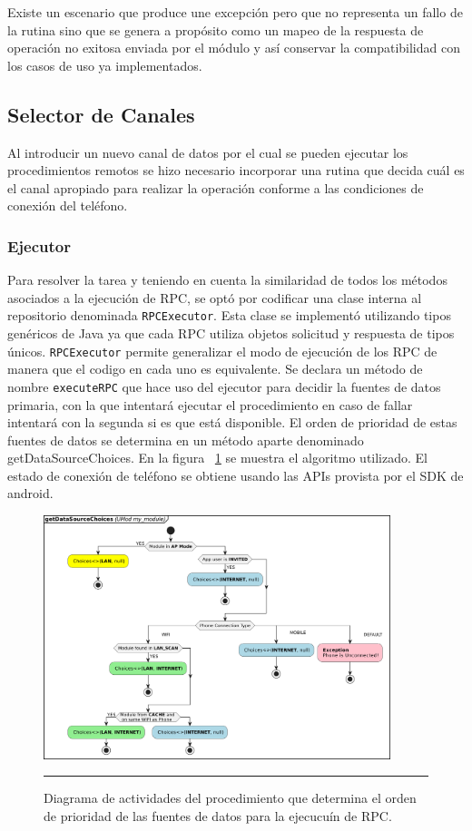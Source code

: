 Existe un escenario que produce une excepción pero que no representa un fallo de la rutina sino que se genera a propósito como un mapeo de la respuesta de operación no exitosa enviada por el módulo y así conservar la compatibilidad con los casos de uso ya implementados.


\subsection{Selector de Canales}
Al introducir un nuevo canal de datos por el cual se pueden ejecutar los procedimientos remotos se hizo necesario incorporar una rutina que decida cuál es el canal apropiado para realizar la operación conforme a las condiciones de conexión del teléfono.
\subsubsection{Ejecutor}
Para resolver la tarea y teniendo en cuenta la similaridad de todos los métodos asociados a la ejecución de RPC, se optó por codificar una clase interna al repositorio denominada \texttt{RPCExecutor}. Esta clase se implementó utilizando tipos genéricos de Java ya que cada RPC utiliza objetos solicitud y respuesta de tipos únicos. \texttt{RPCExecutor} permite generalizar el modo de ejecución de los RPC de manera que el codigo en cada uno es equivalente.
Se declara un método de nombre \texttt{executeRPC} que hace uso del ejecutor para decidir la fuentes de datos primaria, con la que intentará ejecutar el procedimiento en caso de fallar intentará con la segunda si es que está disponible.
El orden de prioridad de estas fuentes de datos se determina en un método aparte denominado getDataSourceChoices. En la figura ~\ref{fig:act_choices} se muestra el algoritmo utilizado. El estado de conexión de teléfono se obtiene usando las APIs provista por el SDK de android.

\begin{figure}[htbp]
	\centering
	\includegraphics[width=0.9\textwidth]{Figures/iter3/ACT_choice_ink.png}
	\rule{35em}{1pt}
	\caption[Actividades Opciones Fuentes de Datos]{Diagrama de actividades del procedimiento que determina el orden de prioridad de las fuentes de datos para la ejecucuín de RPC.}
	\label{fig:act_choices}
\end{figure}



